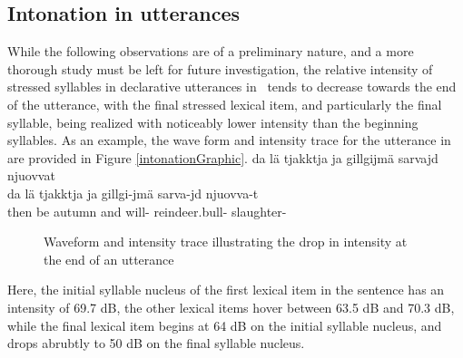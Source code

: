 \subsection{Intonation in utterances}\label{utteranceIntonation}
While the following observations are of a preliminary nature, and a more thorough study must be left for future investigation, the relative intensity of stressed syllables in declarative utterances in \PS\ tends to decrease towards the end of the utterance, with the final stressed lexical item, and particularly the final syllable, being realized with noticeably lower intensity than the beginning syllables. As an example, the wave form and intensity trace for the utterance in  are provided in Figure \vref{intonationGraphic}. %
\ea\label{intonationDropEx}
\glll	da lä tjakktja ja gillgijmä sarvajd njuovvat\\
	da lä tjakktja ja gillgi-jmä sarva-jd njuovva-t\\
	then be\BS{} autumn\BS{} and will- reindeer.bull- slaughter-\\\nopagebreak
{} 
\z 
\setlength\fboxrule{0pt}
\begin{figure}
\caption{Waveform and intensity trace illustrating the drop in intensity at the end of an utterance}\label{intonationGraphic}
\end{figure}
Here, the initial syllable nucleus of the first lexical item in the sentence 
 has an intensity of 69.7 dB, the other lexical items hover between 63.5 dB and 70.3 dB, while the final lexical item  begins at 64 dB on the initial syllable nucleus, and drops abrubtly to 50 dB on the final syllable nucleus. 

